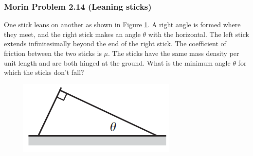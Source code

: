\documentclass{article}
\begin{document}
\subsubsection{Morin Problem 2.14 (Leaning sticks)}
One stick leans on another as shown in Figure \ref{fig:morin2.14}. A right angle is formed where they meet, and the right stick makes an angle $\theta$ with the horizontal. The left stick extends infinitesimally beyond the end of the right stick. The coefficient of friction between the two sticks is $\mu$. The sticks have the same mass density per unit length and are both hinged at the ground. What is the minimum angle $\theta$ for which the sticks don't fall? \\
{
\begin{figure} 
\includegraphics[width=\linewidth]{images/morin2.14.png}
\label{fig:morin2.14}
\end{figure}\\[70pt]
}
\end{document}
